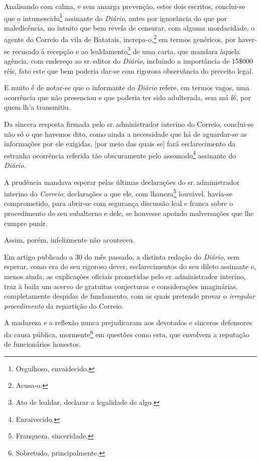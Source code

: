 Analisando com calma, e sem amarga prevenção, estes dois escritos,
conclui-se que o intumescido\footnote{Orgulhoso, envaidecido.}
assinante do \emph{Diário}, antes por ignorância do que por
maledicência, no intuito que bem revela de censurar, com alguma
mordacidade, o agente do Correio da vila de Batatais,
increpa-o,\footnote{Acusa-o.} em termos genéricos, por haver-se
recusado à recepção e ao lealdamento\footnote{Ato de lealdar, declarar
  a legalidade de algo.} de uma carta, que mandara àquela agência, com
endereço ao sr.\,editor do \emph{Diário}, incluindo a importância de
15\$000 réis, fato este que bem poderia dar-se com rigorosa observância
do preceito legal.

E muito é de notar-se que o informante do \emph{Diário} refere, em
termos vagos, uma ocorrência que não presenciou e que poderia ter sido
adulterada, sem má fé, por quem lh'a transmitiu.

Da sincera resposta firmada pelo sr.\,administrador interino do Correio,
conclui-se não só o que havemos dito, como ainda a necessidade que há de
aguardar-se as informações por ele exigidas, {[}por meio das quais se{]}
fará esclarecimento da estranha ocorrência referida tão obscuramente
pelo assomado\footnote{Enraivecido.} assinante do \emph{Diário}.

A prudência mandava esperar pelas últimas declarações do sr.\,administrador interino do \emph{Correio}; declarações a que ele, com
lhaneza\footnote{Franqueza, sinceridade.} louvável, havia-se
comprometido, para abrir-se com segurança discussão leal e franca sobre
o procedimento do seu subalterno e dele, se houvesse apoiado
malversações que lhe cumpre punir.

Assim, porém, infelizmente não aconteceu.

Em artigo publicado a 30 do mês passado, a distinta redação do
\emph{Diário}, sem esperar, como era do seu rigoroso dever,
esclarecimentos do seu dileto assinante e, menos ainda, as explicações
oficiais prometidas pelo sr.\,administrador interino, traz à baila um
acervo de gratuitas conjecturas e considerações imaginárias,
completamente despidas de fundamento, com as quais pretende provar o
\emph{irregular procedimento} da repartição do Correio.

A madureza e a reflexão nunca prejudicaram aos devotados e sinceros
defensores da causa pública, mormente\footnote{Sobretudo,
  principalmente.} em questões como esta, que envolvem a reputação de
funcionários honestos.

